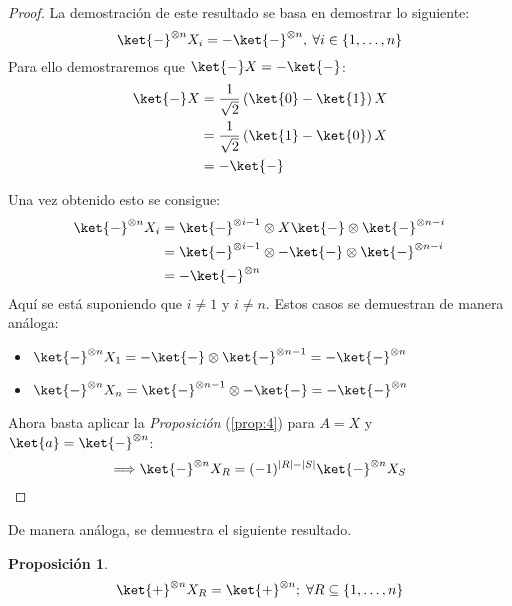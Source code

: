 \documentclass[10pt,conference,a4paper]{IEEEtran}
\newtheorem{prop}{Proposición}[section]
\providecommand{\abs}[1]{\lvert#1\rvert}
\begin{document}
    \begin{proof}
        La demostración de este resultado se basa en demostrar lo siguiente:
        $$ \ket{-}^{\otimes n} X_i =  -\ket{-}^{\otimes n},\:\forall i\in \{1,\ldots, n\}$$
        Para ello demostraremos que $\ket{-}X=-\ket{-}$:
        \begin{align*}
            \ket{-}X&=\dfrac{1}{\sqrt{2}}\left(\ket{0}-\ket{1}\right)X\\
            &=\dfrac{1}{\sqrt{2}}\left(\ket{1}-\ket{0}\right)X\\
            &=-\ket{-}
        \end{align*}

        Una vez obtenido esto se consigue:
        \begin{align*}
            \ket{-}^{\otimes n}X_i&=\ket{-}^{\otimes i-1}\otimes X\ket{-}\otimes\ket{-}^{\otimes n-i}\\
            &=\ket{-}^{\otimes i-1}\otimes -\ket{-}\otimes\ket{-}^{\otimes n-i}\\
            &=-\ket{-}^{\otimes n}
        \end{align*}
        Aquí se está suponiendo que $i\neq 1$ y $i\neq n$. Estos casos se demuestran de manera análoga:
        \vspace{2mm}
        \begin{itemize}
            \item $\ket{-}^{\otimes n}X_1=-\ket{-}\otimes\ket{-}^{\otimes n-1}=-\ket{-}^{\otimes n}$
            \vspace{2mm}
            \item $\ket{-}^{\otimes n}X_n=\ket{-}^{\otimes n-1}\otimes-\ket{-}=-\ket{-}^{\otimes n}$
        \end{itemize}
        \vspace{2mm}
        Ahora basta aplicar la \textit{Proposición} (\ref{prop:4}) para $A=X$ y \\
        $\ket{a}=\ket{-}^{\otimes n}$:
        $$\Longrightarrow  \ket{-}^{\otimes n} X_R=(-1)^{\abs{R}-\abs{S}}\ket{-}^{\otimes n}X_S$$
    \end{proof}
    \vspace{1.5mm}
    De manera análoga, se demuestra el siguiente resultado.
    \vspace{1.5mm}
    \begin{prop}
        \begin{equation}
            \ket{+}^{\otimes n} X_R=\ket{+}^{\otimes n};\; \forall R\subseteq \{1,\ldots,n\}
        \end{equation}
        \label{prop:6}
    \end{prop}
\end{document}
